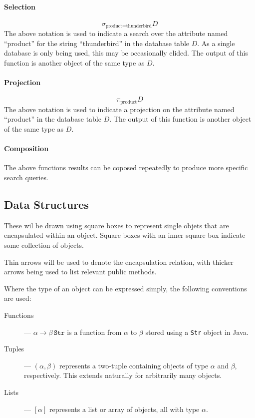 \paragraph{Selection} \[\sigma_{\text{product}=\text{thunderbird}}D\]
The above notation is used to indicate a search over the attribute named
``product'' for the string ``thunderbird'' in the database table $D$.  As a
single database is only being used, this may be occasionally elided.  The output
of this function is another object of the same type as $D$.

\paragraph{Projection}
\[\pi_{\text{product}}D\]
The above notation is used to indicate a projection on the attribute named
``product'' in the database table $D$.  The output of this function is another
object of the same type as $D$.

\paragraph{Composition}
The above functions results can be coposed repeatedly to produce more specific
search queries.

\subsection{Data Structures}
These wil be drawn using square boxes to represent single objets that are encapsulated
within an object.  Square boxes with an inner square box indicate some collection
of objects.

Thin arrows will be used to denote the encapsulation relation, with thicker
arrows being used to list relevant public methods.

Where the type of an object can be expressed simply, the following conventions are used:
\begin{description}
	\item [Functions] --- $\alpha \rightarrow \beta \, \texttt{Str}$ is a function from $\alpha$ to $\beta$ stored using a \texttt{Str} object in Java.
	\item [Tuples] --- $(\alpha, \beta)$ represents a two-tuple containing objects of type $\alpha$ and $\beta$, respectively.  This extends naturally for arbitrarily many objects.
	\item [Lists] --- $[\alpha]$ represents a list or array of objects, all with type $\alpha$.
\end{description}

